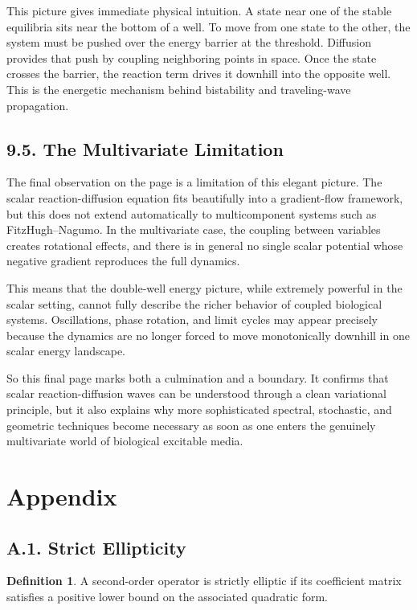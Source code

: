 \documentclass[11pt]{article}
\theoremstyle{definition}
\newtheorem{definition}{Definition}
\theoremstyle{remark}
\begin{document}
This picture gives immediate physical intuition. A state near one of the stable equilibria sits near the bottom of a well. To move from one state to the other, the system must be pushed over the energy barrier at the threshold. Diffusion provides that push by coupling neighboring points in space. Once the state crosses the barrier, the reaction term drives it downhill into the opposite well. This is the energetic mechanism behind bistability and traveling-wave propagation.

\subsection*{9.5. The Multivariate Limitation}
The final observation on the page is a limitation of this elegant picture. The scalar reaction-diffusion equation fits beautifully into a gradient-flow framework, but this does not extend automatically to multicomponent systems such as FitzHugh--Nagumo. In the multivariate case, the coupling between variables creates rotational effects, and there is in general no single scalar potential whose negative gradient reproduces the full dynamics.

This means that the double-well energy picture, while extremely powerful in the scalar setting, cannot fully describe the richer behavior of coupled biological systems. Oscillations, phase rotation, and limit cycles may appear precisely because the dynamics are no longer forced to move monotonically downhill in one scalar energy landscape.

So this final page marks both a culmination and a boundary. It confirms that scalar reaction-diffusion waves can be understood through a clean variational principle, but it also explains why more sophisticated spectral, stochastic, and geometric techniques become necessary as soon as one enters the genuinely multivariate world of biological excitable media.

\section*{Appendix}

\subsection*{A.1. Strict Ellipticity}
\begin{definition}
A second-order operator is strictly elliptic if its coefficient matrix satisfies a positive lower bound on the associated quadratic form.
\end{definition}
\end{document}
